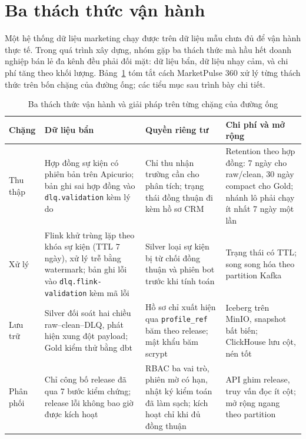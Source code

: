 
\section{Ba thách thức vận hành}
\label{sec:c6-thach-thuc}
Một hệ thống dữ liệu marketing chạy được trên dữ liệu mẫu chưa đủ để vận hành thực tế. Trong quá trình xây dựng, nhóm gặp ba thách thức mà hầu hết doanh nghiệp bán lẻ đa kênh đều phải đối mặt: dữ liệu bẩn, dữ liệu nhạy cảm, và chi phí tăng theo khối lượng. Bảng~\ref{tab:challenges} tóm tắt cách MarketPulse 360 xử lý từng thách thức trên bốn chặng của đường ống; các tiểu mục sau trình bày chi tiết.

\begin{table}[H]
\centering
\caption{Ba thách thức vận hành và giải pháp trên từng chặng của đường ống}
\label{tab:challenges}
\footnotesize
\renewcommand{\arraystretch}{1.25}
\begin{tabularx}{\textwidth}{>{\raggedright\arraybackslash}p{1.9cm} >{\raggedright\arraybackslash}X >{\raggedright\arraybackslash}X >{\raggedright\arraybackslash}X}
\toprule
\textbf{Chặng} & \textbf{Dữ liệu bẩn} & \textbf{Quyền riêng tư} & \textbf{Chi phí và mở rộng} \\
\midrule
Thu thập & Hợp đồng sự kiện có phiên bản trên Apicurio; bản ghi sai hợp đồng vào \texttt{dlq.validation} kèm lý do & Chỉ thu nhận trường cần cho phân tích; trạng thái đồng thuận đi kèm hồ sơ CRM & Retention theo hợp đồng: 7 ngày cho raw/clean, 30 ngày compact cho Gold; nhánh lô phải chạy ít nhất 7 ngày một lần \\
Xử lý & Flink khử trùng lặp theo khóa sự kiện (TTL 7 ngày), xử lý trễ bằng watermark; bản ghi lỗi vào \texttt{dlq.flink-validation} kèm mã lỗi & Silver loại sự kiện bị từ chối đồng thuận và phiên bot trước khi tính toán & Trạng thái có TTL; song song hóa theo partition Kafka \\
Lưu trữ & Silver đối soát hai chiều raw--clean--DLQ, phát hiện xung đột payload; Gold kiểm thử bằng dbt & Hồ sơ chỉ xuất hiện qua \texttt{profile\_ref} băm theo release; mật khẩu băm scrypt & Iceberg trên MinIO, snapshot bất biến; ClickHouse lưu cột, nén tốt \\
Phân phối & Chỉ công bố release đã qua 7 bước kiểm chứng; release lỗi không bao giờ được kích hoạt & RBAC ba vai trò, phiên mờ có hạn, nhật ký kiểm toán đã làm sạch; kích hoạt chỉ khi đủ đồng thuận & API ghim release, truy vấn đọc ít cột; mở rộng ngang theo partition \\
\bottomrule
\end{tabularx}
\end{table}

